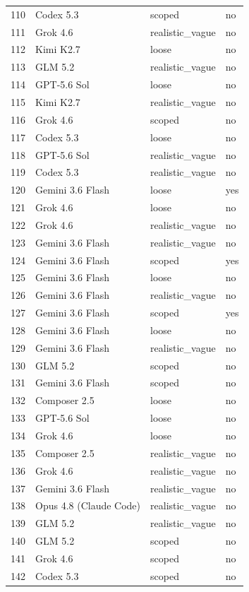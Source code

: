 \begin{tabular}{llll}
110 & Codex 5.3 & scoped & no \\
111 & Grok 4.6 & realistic\_vague & no \\
112 & Kimi K2.7 & loose & no \\
113 & GLM 5.2 & realistic\_vague & no \\
114 & GPT-5.6 Sol & loose & no \\
115 & Kimi K2.7 & realistic\_vague & no \\
116 & Grok 4.6 & scoped & no \\
117 & Codex 5.3 & loose & no \\
118 & GPT-5.6 Sol & realistic\_vague & no \\
119 & Codex 5.3 & realistic\_vague & no \\
120 & Gemini 3.6 Flash & loose & yes \\
121 & Grok 4.6 & loose & no \\
122 & Grok 4.6 & realistic\_vague & no \\
123 & Gemini 3.6 Flash & realistic\_vague & no \\
124 & Gemini 3.6 Flash & scoped & yes \\
125 & Gemini 3.6 Flash & loose & no \\
126 & Gemini 3.6 Flash & realistic\_vague & no \\
127 & Gemini 3.6 Flash & scoped & yes \\
128 & Gemini 3.6 Flash & loose & no \\
129 & Gemini 3.6 Flash & realistic\_vague & no \\
130 & GLM 5.2 & scoped & no \\
131 & Gemini 3.6 Flash & scoped & no \\
132 & Composer 2.5 & loose & no \\
133 & GPT-5.6 Sol & loose & no \\
134 & Grok 4.6 & loose & no \\
135 & Composer 2.5 & realistic\_vague & no \\
136 & Grok 4.6 & realistic\_vague & no \\
137 & Gemini 3.6 Flash & realistic\_vague & no \\
138 & Opus 4.8 (Claude Code) & realistic\_vague & no \\
139 & GLM 5.2 & realistic\_vague & no \\
140 & GLM 5.2 & scoped & no \\
141 & Grok 4.6 & scoped & no \\
142 & Codex 5.3 & scoped & no \\

\end{tabular}
